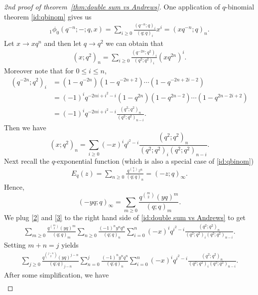 \documentclass[11pt,reqno]{amsart}
\numberwithin{equation}{section}
\theoremstyle{plain}
\theoremstyle{definition}
\theoremstyle{named}
\begin{document}
\begin{proof}[2nd proof of theorem~\ref{thm:double sum vs Andrews}]
One application of $q$-binomial theorem \eqref{id:qbinom} gives us
\begin{align*}
_{1}\phi_{0}(q^{-n}; -; q, x)=\sum_{i\geq 0}\frac{(q^{-n}; q)_{i}}{(q; q)_{i}}x^i=(xq^{-n}; q)_{n}.
\end{align*}
Let $x\rightarrow xq^n$ and then let $q\rightarrow q^2$ we can obtain that
\begin{align*}
(x; q^2)_{n}=\sum_{i\geq 0}\frac{(q^{-2n}; q^2)_{i}}{(q^2; q^2)_{i}}(xq^{2n})^{i}.
\end{align*}
Moreover note that for $0\le i\le n$,
\begin{align*}
(q^{-2n}; q^2)_{i}&=(1-q^{-2n})(1-q^{-2n+2})\cdots (1-q^{-2n+2i-2})\\
&=(-1)^{i}q^{-2ni+i^2-i}(1-q^{2n})(1-q^{2n-2})\cdots (1-q^{2n-2i+2})\\
&=(-1)^iq^{-2ni+i^2-i}\frac{(q^2; q^2)_{n}}{(q^2; q^2)_{n-i}}.
\end{align*}
Then we have 
\begin{equation}
(x; q^2)_{n}=\sum_{i\geq 0}(-x)^{i}q^{i^2-i}\frac{(q^2; q^2)_{n}}{(q^2; q^2)_{i}(q^2; q^2)_{n-i}}.\label{2}
\end{equation}
Next recall the $q$-exponential function (which is also a special case of \eqref{id:qbinom})
\begin{align*}
E_{q}(z)=\sum_{n\geq 0}\frac{q^{\binom{n}{2}}z^n}{(q; q)_{n}}=(-z; q)_{\infty}.
\end{align*}
Hence,
\begin{equation}
(-yq; q)_{\infty}=\sum_{m\geq 0}\frac{q^{\binom{m}{2}}(yq)^m}{(q; q)_{m}}.\label{3}
\end{equation}
We plug \eqref{2} and \eqref{3} to the right hand side of \eqref{id:double sum vs Andrews} to get 
\begin{align*}
\sum_{m\geq 0}\frac{q^{\binom{m}{2}}(yq)^m}{(q; q)_{m}}\sum_{n\geq 0}\frac{(-1)^ny^nq^n}{(q; q)_{n}}\sum_{i= 0}^{n}(-x)^{i}q^{i^2-i}\frac{(q^2; q^2)_{n}}{(q^2; q^2)_{i}(q^2; q^2)_{n-i}}.
\end{align*}
Setting $m+n=j$ yields
\begin{align*}
\sum_{j\geq 0}\frac{q^{\binom{j-n}{2}}(yq)^{j-n}}{(q; q)_{j-n}}\sum_{n=0}^{j}\frac{(-1)^ny^nq^n}{(q; q)_{n}}\sum_{i= 0}^{n}(-x)^{i}q^{i^2-i}\frac{(q^2; q^2)_{n}}{(q^2; q^2)_{i}(q^2; q^2)_{n-i}}.
\end{align*}
After some simplification, we have
\begin{align*}

\end{align*}
\end{proof}
\end{document}
